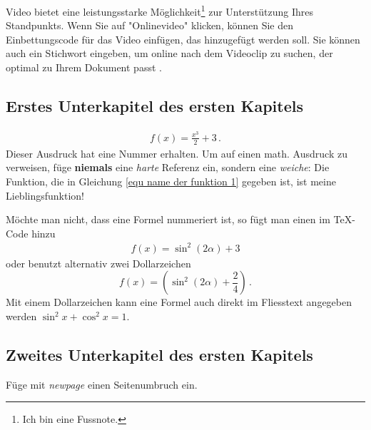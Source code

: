 Video bietet eine leistungsstarke Möglichkeit\footnote{Ich bin eine Fussnote.} zur Unterstützung Ihres Standpunkts. Wenn Sie auf "Onlinevideo" klicken, können Sie den Einbettungscode für das Video einfügen, das hinzugefügt werden soll. Sie können auch ein Stichwort eingeben, um online nach dem Videoclip zu suchen, der optimal zu Ihrem Dokument passt \cite{Ellwanger2015}.

\lipsum[1]

\subsection{Erstes Unterkapitel des ersten Kapitels}


\begin{align}
\label{equ name der funktion 1} %
f(x) = \frac{x^3}{2} + 3 \,. %
\end{align}
Dieser Ausdruck hat eine Nummer erhalten.
Um auf einen math. Ausdruck zu verweisen, füge \textbf{niemals} eine \textit{harte} Referenz ein, sondern eine \textit{weiche}:
Die Funktion, die in Gleichung \eqref{equ name der funktion 1} gegeben ist, ist meine Lieblingsfunktion!

Möchte man nicht, dass eine Formel nummeriert ist, so fügt man einen \* im TeX-Code hinzu
\begin{align*}
f(x) = \sin^2{(2\alpha)} + 3
\end{align*}
oder benutzt alternativ zwei Dollarzeichen
$$
f(x) =  \left( \sin^2{(2\alpha)} + \frac{2}{4} \right) \,.
$$
Mit einem Dollarzeichen kann eine Formel auch direkt im Fliesstext angegeben werden $\sin^2 x + \cos^2 x = 1$.

\subsection{Zweites Unterkapitel des ersten Kapitels}

\lipsum[1]

Füge mit \textit{newpage} einen Seitenumbruch ein.

